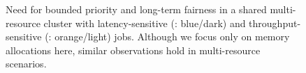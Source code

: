 \begin{figure}[!t]
	\caption{Need for bounded priority and long-term fairness in a shared multi-resource cluster with latency-sensitive (\burstq: blue/dark) and throughput-sensitive (\batchq: orange/light) jobs. 
    Although we focus only on memory allocations here, similar observations hold in multi-resource scenarios. }
	\label{fig:motiv_ex}
		\vspace{-0.1in}
\end{figure}

